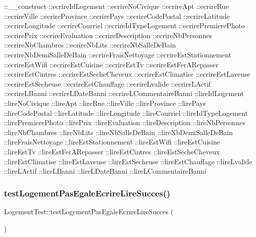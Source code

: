 \+::\+\_\+\+\_\+construct  \+::ecrire\+Id\+Logement  \+::ecrire\+No\+Civique  \+::ecrire\+Apt  \+::ecrire\+Rue  \+::ecrire\+Ville  \+::ecrire\+Province  \+::ecrire\+Pays  \+::ecrire\+Code\+Postal  \+::ecrire\+Latitude  \+::ecrire\+Longitude  \+::ecrire\+Courriel  \+::ecrire\+Id\+Type\+Logement  \+::ecrire\+Premiere\+Photo  \+::ecrire\+Prix  \+::ecrire\+Evaluation  \+::ecrire\+Description  \+::ecrire\+Nb\+Personnes  \+::ecrire\+Nb\+Chambres  \+::ecrire\+Nb\+Lits  \+::ecrire\+Nb\+Salle\+De\+Bain  \+::ecrire\+Nb\+Demi\+Salle\+De\+Bain  \+::ecrire\+Frais\+Nettoyage  \+::ecrire\+Est\+Stationnement  \+::ecrire\+Est\+Wifi  \+::ecrire\+Est\+Cuisine  \+::ecrire\+Est\+Tv  \+::ecrire\+Est\+Fer\+A\+Repasser  \+::ecrire\+Est\+Cintres  \+::ecrire\+Est\+Seche\+Cheveux  \+::ecrire\+Est\+Climatise  \+::ecrire\+Est\+Laveuse  \+::ecrire\+Est\+Secheuse  \+::ecrire\+Est\+Chauffage  \+::ecrire\+Lvalide  \+::ecrire\+L\+Actif  \+::ecrire\+L\+Banni  \+::ecrire\+L\+Date\+Banni  \+::ecrire\+L\+Commentaire\+Banni  \+::lire\+Id\+Logement  \+::lire\+No\+Civique  \+::lire\+Apt  \+::lire\+Rue  \+::lire\+Ville  \+::lire\+Province  \+::lire\+Pays  \+::lire\+Code\+Postal  \+::lire\+Latitude  \+::lire\+Longitude  \+::lire\+Courriel  \+::lire\+Id\+Type\+Logement  \+::lire\+Premiere\+Photo  \+::lire\+Prix  \+::lire\+Evaluation  \+::lire\+Description  \+::lire\+Nb\+Personnes  \+::lire\+Nb\+Chambres  \+::lire\+Nb\+Lits  \+::lire\+Nb\+Salle\+De\+Bain  \+::lire\+Nb\+Demi\+Salle\+De\+Bain  \+::lire\+Frais\+Nettoyage  \+::lire\+Est\+Stationnement  \+::lire\+Est\+Wifi  \+::lire\+Est\+Cuisine  \+::lire\+Est\+Tv  \+::lire\+Est\+Fer\+A\+Repasser  \+::lire\+Est\+Cintres  \+::lire\+Est\+Seche\+Cheveux  \+::lire\+Est\+Climatise  \+::lire\+Est\+Laveuse  \+::lire\+Est\+Secheuse  \+::lire\+Est\+Chauffage  \+::lire\+Lvalide  \+::lire\+L\+Actif  \+::lire\+L\+Banni  \+::lire\+L\+Date\+Banni  \+::lire\+L\+Commentaire\+Banni \mbox{\label{class_logement_test_a02f0a76289821a3e8f25fe930491c6ec}} 
\subsubsection{\texorpdfstring{test\+Logement\+Pas\+Egale\+Ecrire\+Lire\+Succes()}{testLogementPasEgaleEcrireLireSucces()}}
{\footnotesize\ttfamily Logement\+Test\+::test\+Logement\+Pas\+Egale\+Ecrire\+Lire\+Succes (\begin{DoxyParamCaption}{ }\end{DoxyParamCaption})}

